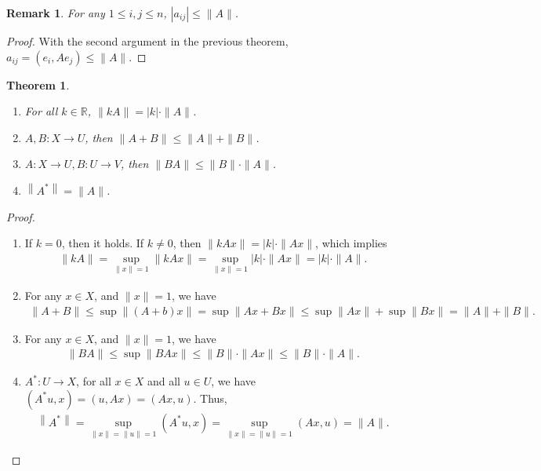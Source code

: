 \documentclass[11pt]{book}
\newtheorem{theorem}{Theorem}[section]
\newtheorem{remark}{Remark}[section]
\theoremstyle{definition}
\numberwithin{equation}{subsection}
\begin{document}
\begin{remark}
For any $1\leq i,j\leq n$, $\left|a_{ij}\right| \leq \|A\|$.
\end{remark}
\begin{proof}
With the second argument in the previous theorem, $a_{ij} = (e_i,Ae_j) \leq \|A\|$.
\end{proof}

\medskip

\begin{theorem}
~\begin{enumerate}[label=(\roman*)]
    \item For all $k\in\mathbb{R}$, $\|kA\| = |k|\cdot \|A\|$.
    \item $A,B:X\to U$, then $\|A + B\|\leq \|A\| + \|B\|$.
    \item $A:X\to U, B:U\to V$, then $\|BA\| \leq \|B\|\cdot \|A\|$.
    \item $\left\|A^*\right\| = \|A\|$.
\end{enumerate}
\end{theorem}
\begin{proof}
~\begin{enumerate}[label=(\roman*)]
    \item If $k = 0$, then it holds. If $k\neq 0$, then $\|kAx\| = |k| \cdot \|Ax\|$, which implies
    \begin{align*}
        \|kA\| = \sup_{\|x\|=1} \|kAx\| = \sup_{\|x\|=1} |k| \cdot \|Ax\| = |k|\cdot \|A\|.
    \end{align*}
    \item For any $x\in X$, and $\|x\| = 1$, we have 
    \begin{align*}
        \|A + B\| \leq \sup \|(A+b)x\|  = \sup \|Ax + Bx\| \leq \sup  \|Ax\| + \sup \|Bx\| = \|A\| + \|B\|.
    \end{align*}
    \item For any $x\in X$, and $\|x\| = 1$, we have 
    \begin{align*}
        \|BA\| \leq \sup\|BAx\|\leq \|B\|\cdot \|Ax\| \leq \|B\|\cdot \|A\|.
    \end{align*}
    \item $A^*:U\to X$, for all $x\in X$ and all $u\in U$, we have $(A^* u, x) = (u, Ax) = (Ax, u)$. Thus, 
    \begin{align*}
        \left\|A^*\right\| = \sup_{\|x\| = \|u\| = 1} (A^*u,x) = \sup_{\|x\| = \|u\| = 1} (Ax,u) = \|A\|.
    \end{align*}
\end{enumerate}
\end{proof}
\end{document}
